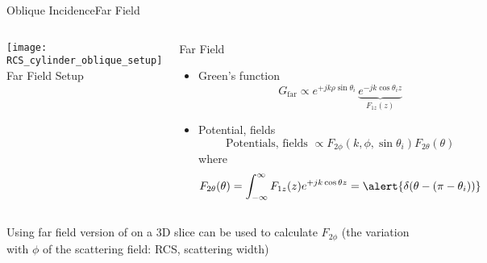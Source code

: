 
\begin{frame}[allowframebreaks]{Oblique Incidence}{Far Field}

  \begin{columns}
     \centering
   \texttt{[image: RCS\_cylinder\_oblique\_setup]}
    \footnotesize{Far Field Setup}

    
     \centering
   \begin{block}{Far Field }
     \begin{itemize}
     \item Green's function
       \begin{equation*}
        G_\text{far} \propto
        e^{+j k \rho \sin\theta_i}\,
        \underbrace{ e^{-j k \cos\theta_i z}}_{F_{1z}(z)}
      \end{equation*}

    \item Potential, fields
      \begin{equation*}
        \text{Potentials, fields } \propto
        F_{2\phi}(k,\phi,\sin\theta_i) F_{2\theta}(\theta)
      \end{equation*}
      where
      \begin{equation*}
        F_{2\theta}(\theta) = \int_{-\infty}^\infty F_{1z}(z)e^{+j k \cos\theta z}
        = \alert{\delta(\theta-(\pi-\theta_i))}
      \end{equation*}
    \end{itemize}
    \end{block}

  \end{columns}

  \vspace{\baselineskip}
  
  \centering\parbox{0.9\linewidth}{\alert{Using far field version of {\GreenD} on a 3D
      slice can be used to calculate $F_{2\phi}$ (the variation
      with $\phi$ of the scattering field: RCS, scattering
      width)} %
  }


  \framebreak %
  

\end{frame}
